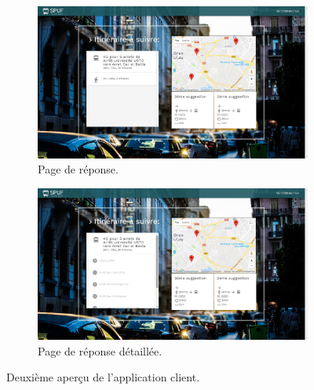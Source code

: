 \begin{figure}
	 \begin{subfigure}[b]{\linewidth}
	 	\includegraphics[width=\linewidth]{img/spuf/response.png}
	 	\caption{Page de réponse.}
	 \end{subfigure}
	 
	 \begin{subfigure}[b]{\linewidth}
	 	\includegraphics[width=\linewidth]{img/spuf/response2.png}
	 	\caption{Page de réponse détaillée.}	 
	 \end{subfigure}
	 \caption{Deuxième aperçu de l'application client.}
	 \label{fig:clientInterface2}
\end{figure}

